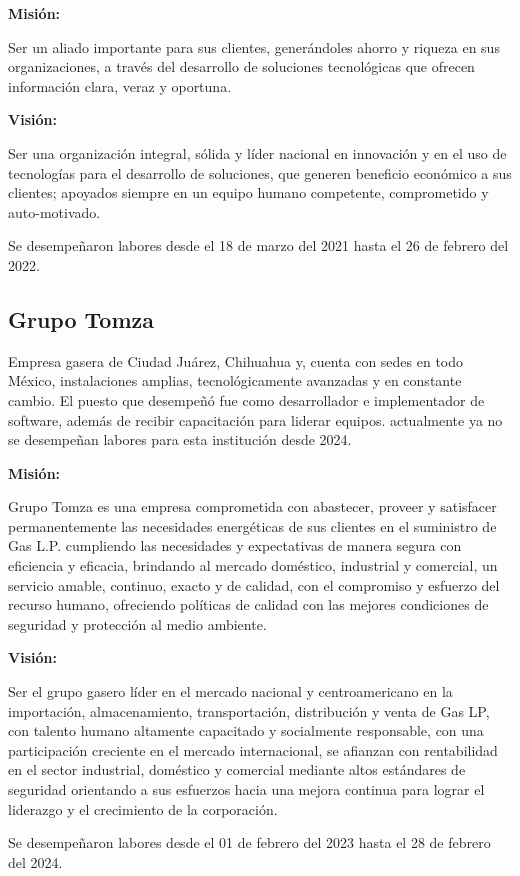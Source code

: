 \documentclass[protocolo.tex]{subfiles}
\begin{document}
\textbf{Misión:}

Ser un aliado importante para sus clientes, generándoles ahorro y riqueza en sus organizaciones, a través del desarrollo de soluciones tecnológicas que ofrecen información clara, veraz y oportuna.\vspace{5mm} 


\textbf{Visión:}

Ser una organización integral, sólida y líder nacional en innovación y en el uso de tecnologías para el desarrollo de soluciones, que generen beneficio económico a sus clientes; apoyados siempre en un equipo humano competente, comprometido y auto-motivado.\vspace{5mm}


Se desempeñaron labores desde el 18 de marzo del 2021 hasta el 26 de febrero del 2022.





\subsection{Grupo Tomza}
Empresa gasera de Ciudad Juárez, Chihuahua y, cuenta con sedes en todo México, instalaciones amplias, 
tecnológicamente avanzadas y en constante cambio.
El puesto que desempeñó fue como desarrollador e implementador de software, 
además de recibir capacitación para liderar equipos. 
actualmente ya no se desempeñan labores para esta institución desde 2024.\vspace{5mm} 

\textbf{Misión:}

Grupo Tomza es una empresa comprometida con abastecer, proveer y satisfacer permanentemente las necesidades energéticas de sus clientes en el suministro de Gas L.P. cumpliendo las necesidades y expectativas de manera segura con eficiencia y eficacia, brindando al mercado doméstico, industrial y comercial, un servicio amable, continuo, exacto y de calidad, con el compromiso y esfuerzo del recurso humano, ofreciendo políticas de calidad con las mejores condiciones de seguridad y protección al medio ambiente.\vspace{5mm} 

\textbf{Visión:} 

Ser el grupo gasero líder en el mercado nacional y centroamericano en la importación, almacenamiento, transportación, distribución y venta de Gas LP, con talento humano altamente capacitado y socialmente responsable, con una participación creciente en el mercado internacional, se afianzan con rentabilidad en el sector industrial, doméstico y comercial mediante altos estándares de seguridad orientando a sus esfuerzos hacia una mejora continua para lograr el liderazgo y el crecimiento de la corporación.\vspace{5mm} 

Se desempeñaron labores desde el 01 de febrero del 2023 hasta el 28 de febrero del 2024.
\end{document}
